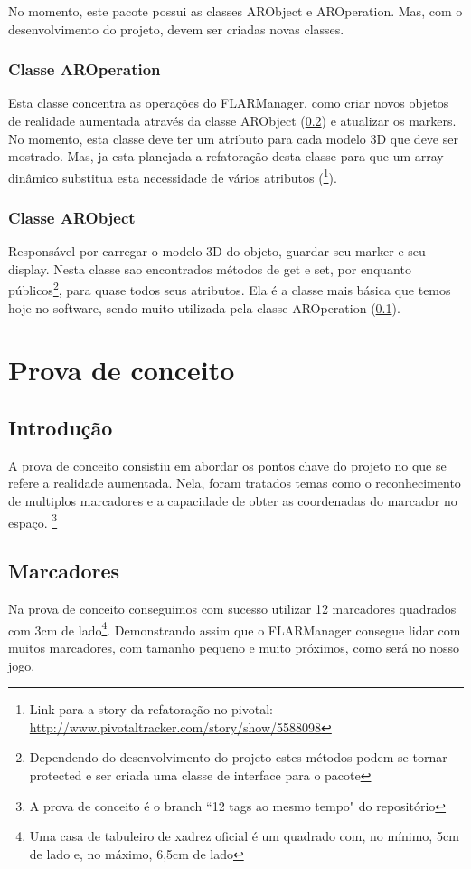 \documentclass[a4paper,12pt]{book}
\begin{document}
		No momento, este pacote possui as classes ARObject e AROperation. Mas, com o
		desenvolvimento do projeto, devem ser criadas novas classes.
		
		\subsection{Classe AROperation}
		\label{subsec:ecclassearoperation}
		Esta classe concentra as opera\c c\~oes do FLARManager, como criar novos
		objetos de realidade aumentada atrav\'es da classe ARObject
		(\ref{subsec:ecclassearobject}) e atualizar os markers.
		No momento, esta classe deve ter um atributo para cada modelo 3D que deve ser
		mostrado. Mas, ja esta planejada a refatora\c c\~ao desta classe para que um
		array din\^amico substitua esta necessidade de v\'arios atributos
		(\footnote{Link para a story da refatora\c c\~ao no	pivotal: \url{http://www.pivotaltracker.com/story/show/5588098}}).
		
		
		\subsection{Classe ARObject}
		\label{subsec:ecclassearobject}
		Respons\'avel por carregar o modelo 3D do objeto, guardar seu marker e seu
		display. Nesta classe sao encontrados m\'etodos de get e set, por enquanto
		p\'ublicos\footnote{Dependendo do desenvolvimento do projeto estes m\'etodos
		podem se tornar protected e ser criada uma classe de interface para o pacote},
		para quase todos seus atributos. Ela \'e a classe mais b\'asica que temos hoje
		no software, sendo muito utilizada pela classe AROperation (\ref{subsec:ecclassearoperation}).
		
	\chapter{Prova de conceito}
	\label{ch:provadeconceito}
		\section{Introdu\c c\~ao}
		\label{sec:pcintroducao}
		A prova de conceito consistiu em abordar os pontos chave do projeto no que se
		refere a realidade aumentada. Nela, foram tratados temas como o reconhecimento
		de multiplos marcadores e a capacidade de obter as coordenadas do marcador no
		espa\c co. \footnote{A prova de conceito \'e o branch ``12 tags ao mesmo
		tempo" do reposit\'orio}
		
		\section{Marcadores}
		\label{sec:pcmarcadores}
		Na prova de conceito conseguimos com sucesso utilizar 12 marcadores quadrados
		com 3cm de lado\footnote{Uma casa de tabuleiro de xadrez oficial \'e um
		quadrado com, no m\'inimo, 5cm de lado e, no m\'aximo, 6,5cm de lado}. Demonstrando assim que
		o FLARManager consegue lidar com muitos marcadores, com tamanho pequeno e muito pr\'oximos, como ser\'a no
		nosso jogo.
		
\end{document}
